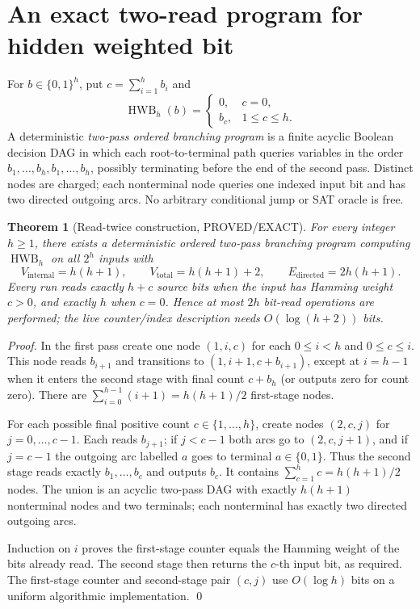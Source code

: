 \documentclass[11pt]{article}
\newtheorem{theorem}{Theorem}
\begin{document}
\section{An exact two-read program for hidden weighted bit}
For $b\in\{0,1\}^h$, put $c=\sum_{i=1}^h b_i$ and
\[
\operatorname{HWB}_h(b)=
\begin{cases}
0,&c=0,\\ b_c,&1\le c\le h.
\end{cases}
\]
A deterministic \emph{two-pass ordered branching program} is a finite acyclic Boolean decision DAG in which each root-to-terminal path queries variables in the order $b_1,\ldots,b_h,b_1,\ldots,b_h$, possibly terminating before the end of the second pass. Distinct nodes are charged; each nonterminal node queries one indexed input bit and has two directed outgoing arcs. No arbitrary conditional jump or SAT oracle is free.

\begin{theorem}[Read-twice construction, PROVED/EXACT]
For every integer $h\ge1$, there exists a deterministic ordered two-pass branching program computing $\operatorname{HWB}_h$ on \emph{all} $2^h$ inputs with
\[
V_{\mathrm{internal}}=h(h+1),\qquad
V_{\mathrm{total}}=h(h+1)+2,\qquad
E_{\mathrm{directed}}=2h(h+1).
\]
Every run reads exactly $h+c$ source bits when the input has Hamming weight $c>0$, and exactly $h$ when $c=0$. Hence at most $2h$ bit-read operations are performed; the live counter/index description needs $O(\log(h+2))$ bits.
\end{theorem}
\begin{proof}
In the first pass create one node $(1,i,c)$ for each $0\le i<h$ and $0\le c\le i$. This node reads $b_{i+1}$ and transitions to $(1,i+1,c+b_{i+1})$, except at $i=h-1$ when it enters the second stage with final count $c+b_h$ (or outputs zero for count zero). There are
$\sum_{i=0}^{h-1}(i+1)=h(h+1)/2$ first-stage nodes.

For each possible final positive count $c\in\{1,\ldots,h\}$, create nodes $(2,c,j)$ for $j=0,\ldots,c-1$. Each reads $b_{j+1}$; if $j<c-1$ both arcs go to $(2,c,j+1)$, and if $j=c-1$ the outgoing arc labelled $a$ goes to terminal $a\in\{0,1\}$. Thus the second stage reads exactly $b_1,\ldots,b_c$ and outputs $b_c$. It contains $\sum_{c=1}^h c=h(h+1)/2$ nodes. The union is an acyclic two-pass DAG with exactly $h(h+1)$ nonterminal nodes and two terminals; each nonterminal has exactly two directed outgoing arcs.

Induction on $i$ proves the first-stage counter equals the Hamming weight of the bits already read. The second stage then returns the $c$-th input bit, as required. The first-stage counter and second-stage pair $(c,j)$ use $O(\log h)$ bits on a uniform algorithmic implementation. \qed
\end{proof}
\end{document}
